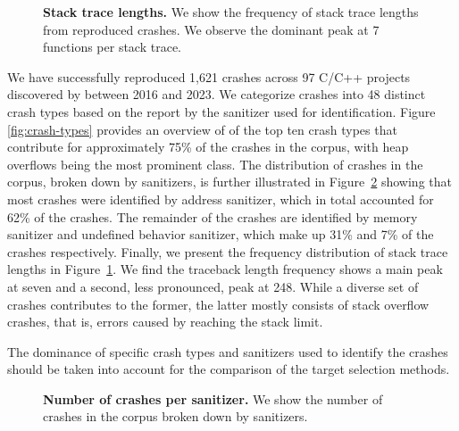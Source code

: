 \begin{figure}
	\begin{center}
		
	\end{center}
	\caption{\textbf{Stack trace lengths.} \normalfont We show the frequency of stack trace lengths from reproduced crashes. We observe the dominant peak at 7 functions per stack trace.}
	\label{fig:traceback-length}
\end{figure}

 We have successfully reproduced 1,621 crashes across 97 C/C++ projects discovered by \ossfuzz{} between 2016 and 2023. We categorize crashes into 48 distinct crash types based on the report by the sanitizer used for identification. Figure \ref{fig:crash-types} provides an overview of of the top ten crash types that contribute for approximately 75\% of the crashes in the corpus, with heap overflows being the most prominent class.
The distribution of crashes in the corpus, broken down by sanitizers, is further illustrated in Figure~\ref{fig:sanitizers} showing that most crashes were identified by address sanitizer, which in total accounted for 62\% of the crashes. The remainder of the crashes are identified by memory sanitizer and undefined behavior sanitizer, which make up 31\% and 7\% of the crashes respectively. Finally, we present the frequency distribution of stack trace lengths in Figure~\ref{fig:traceback-length}. We find the traceback length frequency shows a main peak at seven and a second, less pronounced, peak at 248. While a diverse set of crashes contributes to the former, the latter mostly consists of stack overflow crashes, that is, errors caused by reaching the stack limit.

The dominance of specific crash types and sanitizers used to identify the crashes should be taken into account for the comparison of the target selection methods. 

\begin{figure}
	\begin{center}
		
	\end{center}
	\caption{\textbf{Number of crashes per sanitizer.} \normalfont We show the number of crashes in the corpus broken down by sanitizers.}
	\label{fig:sanitizers}
\end{figure}